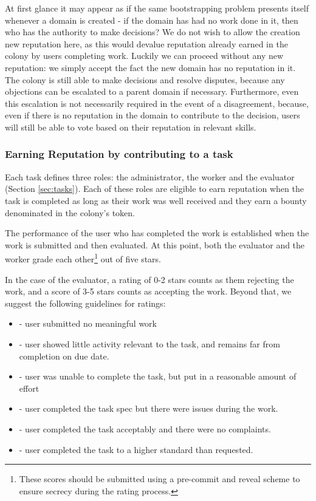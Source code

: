At first glance it may appear as if the same bootstrapping problem presents itself whenever a domain is created - if the domain has had no work done in it, then who has the authority to make decisions? We do not wish to allow the creation new reputation here, as this would devalue reputation already earned in the colony by users completing work. Luckily we can proceed without any new reputation: we simply accept the fact the new domain has no reputation in it. The colony is still able to make decisions and resolve disputes, because any objections can be escalated to a parent domain if necessary. Furthermore, even this escalation is not necessarily required in the event of a disagreement, because, even if there is no reputation in the domain to contribute to the decision, users will still be able to vote based on their reputation in relevant skills.

\subsubsection{Earning Reputation by contributing to a task}\label{sec:earning-rep-from-task}
Each task defines three roles: the administrator, the worker and the evaluator (Section \ref{sec:tasks}). Each of these roles are eligible to earn reputation when the task is completed as long as their work was well received and they earn a bounty denominated in the colony's token. 

The performance of the user who has completed the work is established when the work is submitted and then evaluated. At this point, both the evaluator and the worker grade each other\footnote{These scores should be submitted using a pre-commit and reveal scheme to ensure secrecy during the rating process.} out of five stars.

In the case of the evaluator, a rating of 0-2 stars counts as them rejecting the work, and a score of 3-5 stars counts as accepting the work. Beyond that, we suggest the following guidelines for ratings:
\begin{itemize}
 \item[0 stars] - user submitted no meaningful work 
 \item[1 star\phantom{s}] - user showed little activity relevant to the task, and remains far from completion on due date.
 \item[2 stars] - user was unable to complete the task, but put in a reasonable amount of effort
 \item[3 stars] - user completed the task spec but there were issues during the work.
 \item[4 stars] - user completed the task acceptably and there were no complaints.
 \item[5 stars] - user completed the task to a higher standard than requested.
\end{itemize}


